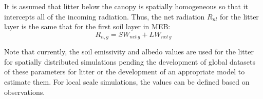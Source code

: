 {It is assumed that litter below the canopy is spatially homogeneous so
that it intercepts all of the incoming radiation. Thus, the net
radiation $R_{nl}$ for the litter layer is the same that for the first
soil layer in MEB:
%
\begin{equation}
 R_{n,g} = SW_{net\,g} +LW_{net\,g}
\end{equation}
%

%
Note that currently, the soil emissivity and albedo values are used
for the litter for spatially distributed simulations pending the
development of global datasets of these parameters for litter or the
development of an appropriate model to estimate them. 
For local scale simulations, the
values can be defined based on observations.

}
